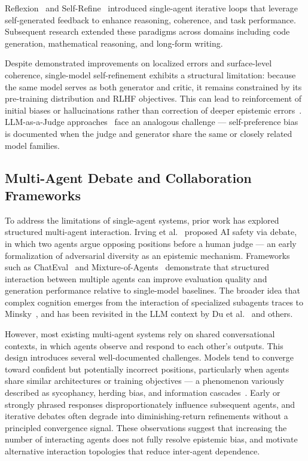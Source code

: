 \documentclass[11pt, a4paper]{article}
\begin{document}
Reflexion~\cite{shinn2023reflexion} and Self-Refine~\cite{madaan2023self} introduced single-agent iterative loops that leverage self-generated feedback to enhance reasoning, coherence, and task performance. Subsequent research extended these paradigms across domains including code generation, mathematical reasoning, and long-form writing.

Despite demonstrated improvements on localized errors and surface-level coherence, single-model self-refinement exhibits a structural limitation: because the same model serves as both generator and critic, it remains constrained by its pre-training distribution and RLHF objectives. This can lead to reinforcement of initial biases or hallucinations rather than correction of deeper epistemic errors~\cite{madaan2023self,shinn2023reflexion}. LLM-as-a-Judge approaches~\cite{zheng2023judging,gu2024survey} face an analogous challenge --- self-preference bias is documented when the judge and generator share the same or closely related model families.

\subsection{Multi-Agent Debate and Collaboration Frameworks}

To address the limitations of single-agent systems, prior work has explored structured multi-agent interaction. Irving et al.~\cite{irving2018ai} proposed AI safety via debate, in which two agents argue opposing positions before a human judge --- an early formalization of adversarial diversity as an epistemic mechanism. Frameworks such as ChatEval~\cite{chan2024chateval} and Mixture-of-Agents~\cite{wang2024mixture} demonstrate that structured interaction between multiple agents can improve evaluation quality and generation performance relative to single-model baselines. The broader idea that complex cognition emerges from the interaction of specialized subagents traces to Minsky~\cite{minsky1986society}, and has been revisited in the LLM context by Du et al.~\cite{du2023improving} and others.

However, most existing multi-agent systems rely on shared conversational contexts, in which agents observe and respond to each other's outputs. This design introduces several well-documented challenges. Models tend to converge toward confident but potentially incorrect positions, particularly when agents share similar architectures or training objectives --- a phenomenon variously described as sycophancy, herding bias, and information cascades~\cite{du2023improving,yao2025peacemaker,taubenfeld2024systematic}. Early or strongly phrased responses disproportionately influence subsequent agents, and iterative debates often degrade into diminishing-return refinements without a principled convergence signal. These observations suggest that increasing the number of interacting agents does not fully resolve epistemic bias, and motivate alternative interaction topologies that reduce inter-agent dependence.
\end{document}
